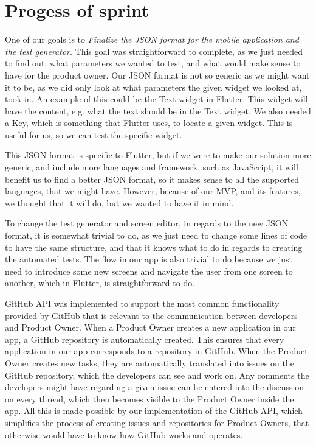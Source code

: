 \section{Progess of sprint}

One of our goals is to \textit{Finalize the JSON format for the mobile application and the test generator}.
This goal was straightforward to complete, as we just needed to find out, what parameters we wanted to test, and what would make sense to have for the product owner.
Our JSON format is not so generic as we might want it to be, as we did only look at what parameters the given widget we looked at, took in.
An example of this could be the Text widget in Flutter.
This widget will have the content, e.g. what the text should be in the Text widget.
We also needed a Key, which is something that Flutter uses, to locate a given widget. 
This is useful for us, so we can test the specific widget.

This JSON format is specific to Flutter, but if we were to make our solution more generic, and include more languages and framework, such as JavaScript, it will benefit us to find a better JSON format, so it makes sense to all the supported languages, that we might have.
However, because of our MVP, and its features, we thought that it will do, but we wanted to have it in mind.

To change the test generator and screen editor, in regards to the new JSON format, it is somewhat trivial to do, as we just need to change some lines of code to have the same structure, and that it knows what to do in regards to creating the automated tests.
The flow in our app is also trivial to do because we just need to introduce some new screens and navigate the user from one screen to another, which in Flutter, is straightforward to do.

GitHub API was implemented to support the most common functionality provided by GitHub that is relevant to the communication between developers and Product Owner.
When a Product Owner creates a new application in our app, a GitHub repository is automatically created.
This ensures that every application in our app corresponds to a repository in GitHub. 
When the Product Owner creates new tasks, they are automatically translated into issues on the GitHub repository, which the developers can see and work on. 
Any comments the developers might have regarding a given issue can be entered into the discussion on every thread, which then becomes visible to the Product Owner inside the app.
All this is made possible by our implementation of the GitHub API, which simplifies the process of creating issues and repositories for Product Owners, that otherwise would have to know how GitHub works and operates.